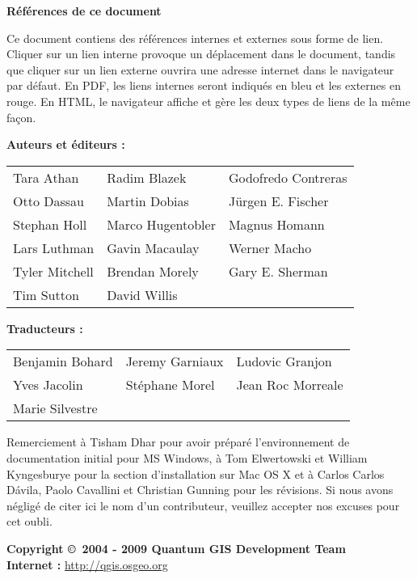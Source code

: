 \textbf{R\'ef\'erences de ce document}

Ce document contiens des r\'ef\'erences internes et externes sous forme de lien. Cliquer sur un lien interne provoque un d\'eplacement dans le document, tandis que cliquer sur un lien externe ouvrira une adresse internet dans le navigateur par d\'efaut. En PDF, les liens internes seront indiqu\'es en bleu et les externes en rouge. En HTML, le navigateur affiche et g\`ere les deux types de liens de la m\^eme fa\c{c}on.

\newpage

\begin{flushleft}
\textbf{Auteurs et \'editeurs :}
 
\begin{tabular}{p{5cm} p{5cm} p{5cm}}
Tara Athan & Radim Blazek & Godofredo Contreras \\
Otto Dassau & Martin Dobias & J\"urgen E. Fischer \\ 
Stephan Holl & Marco Hugentobler & Magnus Homann \\ 
Lars Luthman & Gavin Macaulay & Werner Macho \\
Tyler Mitchell & Brendan Morely & Gary E. Sherman \\ 
Tim Sutton & David Willis &  \\
\end{tabular}
\end{flushleft}

\begin{flushleft}
\textbf{Traducteurs :}
 
\begin{tabular}{p{5cm} p{5cm} p{5cm}}
Benjamin Bohard & Jeremy Garniaux & Ludovic Granjon \\
Yves Jacolin & St\'ephane Morel & Jean Roc Morreale \\
Marie Silvestre \\
\end{tabular}


Remerciement \`a Tisham Dhar pour avoir pr\'epar\'e l'environnement de documentation initial pour MS Windows, \`a Tom Elwertowski et William Kyngesburye pour la section d'installation sur Mac OS X et \`a Carlos Carlos D\'{a}vila, Paolo Cavallini et Christian Gunning pour les r\'evisions. Si nous avons n\'eglig\'e de citer ici le nom d'un contributeur, veuillez accepter nos excuses pour cet oubli.

\textbf{Copyright \copyright~2004 - 2009 Quantum GIS Development Team} \\
\textbf{Internet :} \url{http://qgis.osgeo.org}
\end{flushleft}

